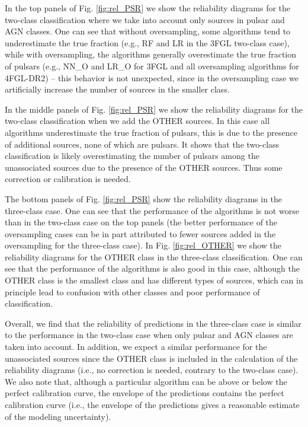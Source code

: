 \documentclass[referee]{aa} %
\begin{document}
\begin{appendix}
In the top panels of Fig. \ref{fig:rel_PSR} we show the reliability diagrams for the two-class classification
where we take into account only sources in pulsar and AGN classes.
One can see that without oversampling, some algorithms tend to underestimate the true fraction (e.g., RF and LR in the 3FGL two-class case),
while with oversampling, the algorithms generally overestimate the true fraction of pulsars (e.g., NN\_O and LR\_O for 3FGL and all oversampling algorithms for 4FGL-DR2) -- this behavior is not unexpected, since in the oversampling case we artificially increase the number of sources in the smaller class.

In the middle panels of Fig. \ref{fig:rel_PSR} we show the reliability diagrams  for the two-class classification
when we add the OTHER sources.
In this case all algorithms underestimate the true fraction of pulsars, this is due to the presence of additional sources,
none of which are pulsars.
It shows that the two-class classification is likely overestimating the number of pulsars among the unassociated sources
due to the presence of the OTHER sources.
Thus some correction or calibration is needed.

The bottom panels of Fig. \ref{fig:rel_PSR} show the reliability diagrams in the three-class case.
One can see that the performance of the algorithms is not worse than in the two-class case on the top panels
(the better performance of the oversampling cases can be in part attributed to fewer sources added in the oversampling
for the three-class case).
In Fig. \ref{fig:rel_OTHER} we show the reliability diagrams for the OTHER class in the three-class classification.
One can see that the performance of the algorithms is also good in this case, although the OTHER class is the smallest class
and has different types of sources, which can in principle lead to confusion with other classes
and poor performance of classification.

Overall, we find that the reliability of predictions in the three-class case is similar to the performance
in the two-class case when only pulsar and AGN classes are taken into account.
In addition, we expect a similar performance for the unassociated sources since the OTHER class is included in the 
calculation of the reliability diagrams (i.e., no correction is needed, contrary to the two-class case). %
We also note that, although a particular algorithm can be above or below the perfect calibration curve, 
the envelope of the predictions contains the perfect calibration curve (i.e., the envelope of the predictions gives a reasonable
estimate of the modeling uncertainty).



\end{appendix}
\end{document}
